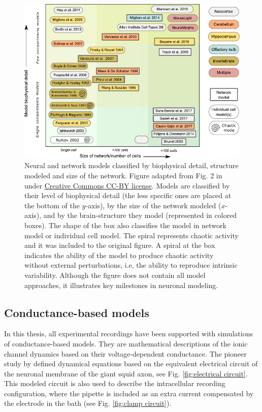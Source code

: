 \begin{figure}[bth!]
	\centering
	\includegraphics[width=\textwidth]{img/intro/models classification_v2.pdf}
	\caption{Neural and network models classified by biophysical detail, structure modeled and size of the network. Figure adapted from Fig. 2 in \textcite{gleeson_open_2019} under \href{http://creativecommons.org/licenses/by/4.0/}{Creative Commons CC-BY license}. Models are classified by their level of biophysical detail (the less specific ones are placed at the bottom of the  $y$-axis), by the size of the network modeled ($x$-axis),  and by the brain-structure they model (represented in colored boxes). The shape of the box also classifies the model in network model or individual cell model. The spiral represents chaotic activity and it was included to the original figure. A spiral at the box indicates the ability of the model to produce chaotic activity without external perturbations, i.e, the ability to reproduce intrinsic variability. Although the figure does not contain all model approaches, it illustrates key milestones in neuronal modeling. }
	\label{fig:models-classification}
\end{figure}
\subsection{Conductance-based models}

In this thesis, all experimental recordings have been supported with simulations of conductance-based models. They are  mathematical descriptions of the ionic channel dynamics based on their voltage-dependent conductance. The pioneer study by \textcite{hodgkin_quantitative_1952} defined dynamical equations based on the equivalent electrical circuit of the neuronal membrane of the giant squid axon, see Fig.  \ref{fig:electrical circuit}. This modeled circuit is also used to describe the intracellular recording configuration, where the pipette is included as an extra current compensated by the electrode in the bath (see Fig. \ref{fig:clamp circuit}).

